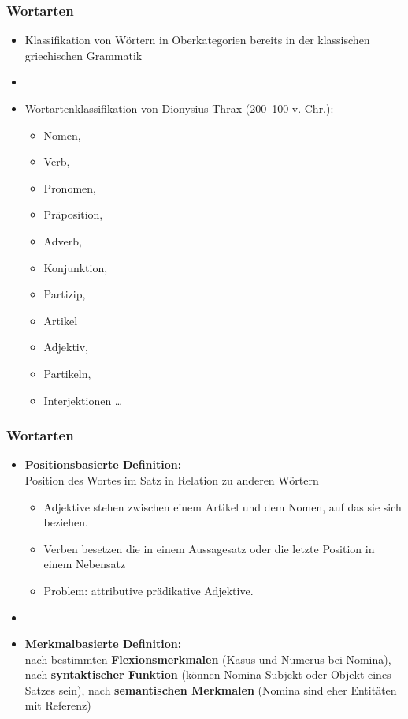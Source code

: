 \begin{frame}
\frametitle{Wortarten}

\begin{itemize}
	\item Klassifikation von Wörtern in Oberkategorien \ras bereits in der klassischen griechischen Grammatik
	\item[]
	\item Wortartenklassifikation von Dionysius Thrax (200--100 v. Chr.):
\pause
	\begin{itemize}
		\item Nomen,
		\item Verb, 
		\item Pronomen,
		\item Präposition,
		\item Adverb,
		\item Konjunktion,
		\item Partizip,
		\item Artikel
	\end{itemize}
\pause
	\begin{itemize}
		\item Adjektiv,
		\item Partikeln,
		\item Interjektionen \dots
	\end{itemize}
\end{itemize}

\end{frame}


\begin{frame}
\frametitle{Wortarten}

\begin{itemize}
	\item \textbf{Positionsbasierte Definition:}\\
	Position des Wortes im Satz in Relation zu anderen Wörtern
	\begin{itemize}
		\item Adjektive stehen zwischen einem Artikel und dem Nomen, auf das sie sich beziehen.
		\item Verben besetzen \idR die  in einem Aussagesatz oder die letzte Position in einem Nebensatz
		\item Problem: attributive \vs prädikative Adjektive.
	\end{itemize}

	\item[]
	\item \textbf{Merkmalbasierte Definition:}\\
	nach bestimmten \textbf{Flexionsmerkmalen} (Kasus und Numerus bei Nomina), nach \textbf{syntaktischer Funktion} (\idR können Nomina Subjekt oder Objekt eines Satzes sein), nach \textbf{semantischen Merkmalen} (Nomina sind eher Entitäten mit Referenz)


\end{itemize}

\end{frame}


